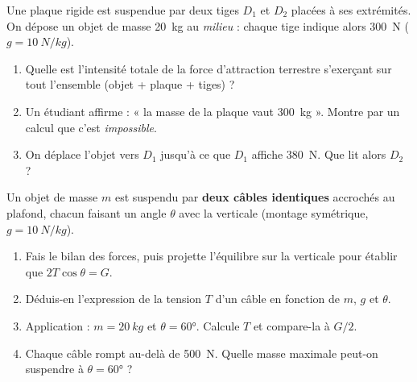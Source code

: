 \documentclass[11pt,a4paper]{article}
\newcommand{\vv}[1]{\vec{#1}}\newcommand{\ds}{\displaystyle}
\begin{document}
\begin{exo}
Une plaque rigide est suspendue par deux tiges $D_1$ et $D_2$ placées à ses extrémités. On dépose
un objet de masse \qty{20}{kg} au \emph{milieu} : chaque tige indique alors \qty{300}{N}
($g=\qty{10}{N/kg}$).
\begin{enumerate}[label=\alph*)]
  \item Quelle est l'intensité totale de la force d'attraction terrestre s'exerçant sur tout
        l'ensemble (objet + plaque + tiges) ?
  \item Un étudiant affirme : « la masse de la plaque vaut \qty{300}{kg} ». Montre par un calcul que
        c'est \emph{impossible}.
  \item On déplace l'objet vers $D_1$ jusqu'à ce que $D_1$ affiche \qty{380}{N}. Que lit alors $D_2$ ?
\end{enumerate}
\end{exo}

\begin{exo}
Un objet de masse $m$ est suspendu par \textbf{deux câbles identiques} accrochés au plafond, chacun
faisant un angle $\theta$ avec la verticale (montage symétrique, $g=\qty{10}{N/kg}$).
\begin{center}
\end{center}
\begin{enumerate}[label=\alph*)]
  \item Fais le bilan des forces, puis projette l'équilibre sur la verticale pour établir que
        $2T\cos\theta = G$.
  \item Déduis-en l'expression de la tension $T$ d'un câble en fonction de $m$, $g$ et $\theta$.
  \item Application : $m=\qty{20}{kg}$ et $\theta=\ang{60}$. Calcule $T$ et compare-la à $G/2$.
  \item Chaque câble rompt au-delà de \qty{500}{N}. Quelle masse maximale peut-on suspendre à
        $\theta=\ang{60}$ ?
\end{enumerate}
\end{exo}
\end{document}

